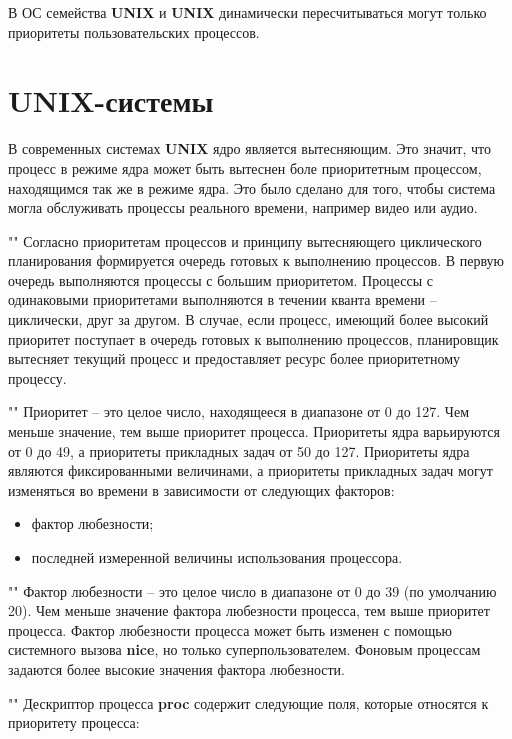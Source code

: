 В ОС семейства \textbf{UNIX} и \textbf{UNIX} динамически пересчитываться  могут только приоритеты пользовательских процессов.

\section{UNIX-системы}

В современных системах \textbf{UNIX} ядро является вытесняющим. Это значит, что процесс в режиме ядра может быть вытеснен боле приоритетным процессом, находящимся так же в режиме ядра. Это было сделано для того, чтобы система могла обслуживать процессы реального времени, например видео или аудио.

""\newline
\noindent Согласно приоритетам процессов и принципу вытесняющего циклического планирования формируется очередь готовых к выполнению процессов. В первую очередь выполняются процессы с большим приоритетом. Процессы с одинаковыми приоритетами выполняются в течении кванта времени -- циклически, друг за другом. В случае, если процесс, имеющий более высокий приоритет поступает в очередь готовых к выполнению процессов, планировщик вытесняет текущий процесс и предоставляет ресурс более приоритетному процессу.

""\newline
\noindent Приоритет -- это целое число, находящееся в диапазоне от 0 до 127. Чем меньше значение, тем выше приоритет процесса. Приоритеты ядра варьируются от 0 до 49, а приоритеты прикладных задач от 50 до 127. Приоритеты ядра являются фиксированными величинами, а приоритеты прикладных задач могут изменяться во времени в зависимости от следующих факторов:

\begin{itemize}
    \item фактор любезности;
    \item последней измеренной величины использования процессора.
\end{itemize}

""\newline
\noindent Фактор любезности -- это целое число в диапазоне от 0 до 39 (по умолчанию 20). Чем меньше значение фактора любезности процесса, тем выше приоритет процесса. Фактор любезности процесса может быть изменен с помощью системного вызова \textbf{nice}, но только суперпользователем. Фоновым процессам задаются более высокие значения фактора любезности.

""\newline
\noindent Дескриптор процесса \textbf{proc} содержит следующие поля, которые относятся к приоритету процесса:

